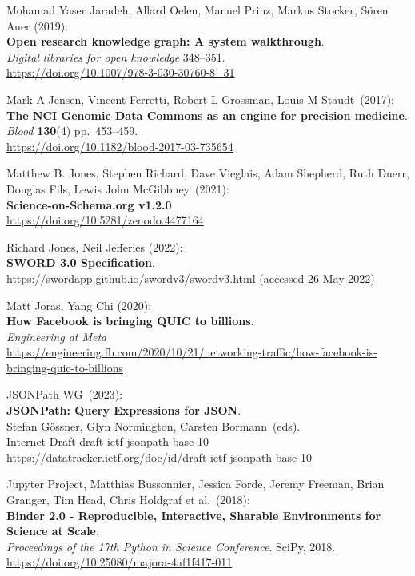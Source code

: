 \begin{thebibliography}{9}
Mohamad Yaser Jaradeh, Allard Oelen, Manuel Prinz, Markus Stocker, Sören Auer (2019): \\
\textbf{Open research knowledge graph: A system walkthrough}. \\
\emph{Digital libraries for open knowledge} 348--351.\\
\url{https://doi.org/10.1007/978-3-030-30760-8_31}

Mark A Jensen, Vincent Ferretti, Robert L Grossman, Louis M
Staudt~(2017):\\
\textbf{The NCI Genomic Data Commons as an engine for precision
medicine}.\\
\emph{Blood} \textbf{130}(4) pp.~453--459.\\
\url{https://doi.org/10.1182/blood-2017-03-735654}

Matthew B. Jones, Stephen Richard, Dave Vieglais, Adam
Shepherd, Ruth Duerr, Douglas Fils, Lewis John McGibbney~(2021):\\
\textbf{Science-on-Schema.org v1.2.0}\\
\url{https://doi.org/10.5281/zenodo.4477164}

Richard Jones, Neil Jefferies (2022): \\
\textbf{SWORD 3.0 Specification}. \\
\url{https://swordapp.github.io/swordv3/swordv3.html} (accessed 26 May
2022)

Matt Joras, Yang Chi (2020): \\
\textbf{How Facebook is bringing QUIC to billions}.\\
\emph{Engineering at Meta}\\
\url{https://engineering.fb.com/2020/10/21/networking-traffic/how-facebook-is-bringing-quic-to-billions}

JSONPath WG~(2023):\\
\textbf{JSONPath: Query Expressions for JSON}.\\
Stefan Gössner, Glyn Normington, Carsten Bormann~(eds).\\
Internet-Draft draft-ietf-jsonpath-base-10\\
\url{https://datatracker.ietf.org/doc/id/draft-ietf-jsonpath-base-10}

Jupyter Project, Matthias Bussonnier, Jessica Forde, Jeremy
Freeman, Brian Granger, Tim Head, Chris Holdgraf et al.~(2018):\\
\textbf{Binder 2.0 - Reproducible, Interactive, Sharable Environments
for Science at Scale}.\\
\emph{Proceedings of the 17th Python in Science
Conference}. SciPy, 2018.\\
\url{https://doi.org/10.25080/majora-4af1f417-011}


\end{thebibliography}
